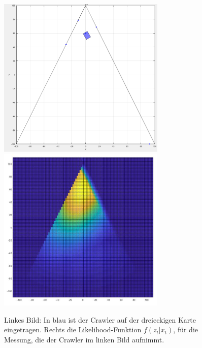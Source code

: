 \begin{figure}[ht]
	\centering
	\includegraphics[width=8cm]{Images/likelihoodPosition.png}
    \includegraphics[width=8cm]{Images/likelihood.jpg}  
	\caption{Linkes Bild: In blau ist der Crawler auf der dreieckigen Karte eingetragen. Rechts die Likelihood-Funktion $f(z_t | x_t)$, für die Messung, die der Crawler im linken Bild aufnimmt.}
	\label{fig:likelihood}
\end{figure}
